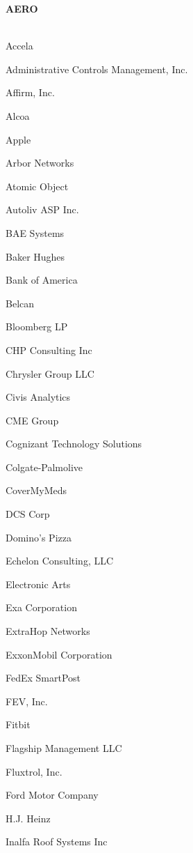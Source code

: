 \documentclass[twoside]{article}
\begin{document}
    \begin{center}\begin{multicols}{5}
    {\fontsize{14}{16}\selectfont \bf AERO}\\
        \vspace{-1em}
        ~\hrulefill~
        \vspace{-.9em}
        \begin{FlushLeft}
        \begin{compactitem}
        \item Accela
\item Administrative Controls Management, Inc.
\item Affirm, Inc.
\item Alcoa
\item Apple
\item Arbor Networks
\item Atomic Object
\item Autoliv ASP Inc.
\item BAE Systems
\item Baker Hughes
\item Bank of America
\item Belcan
\item Bloomberg LP
\item CHP Consulting Inc
\item Chrysler Group LLC
\item Civis Analytics
\item CME Group
\item Cognizant Technology Solutions
\item Colgate-Palmolive
\item CoverMyMeds
\item DCS Corp
\item Domino's Pizza
\item Echelon Consulting, LLC
\item Electronic Arts
\item Exa Corporation
\item ExtraHop Networks
\item ExxonMobil Corporation
\item FedEx SmartPost
\item FEV, Inc.
\item Fitbit
\item Flagship Management LLC
\item Fluxtrol, Inc.
\item Ford Motor Company
\item H.J. Heinz
\item Inalfa Roof Systems Inc

\end{compactitem}
\end{FlushLeft}
\end{multicols}
\end{center}
\end{document}
